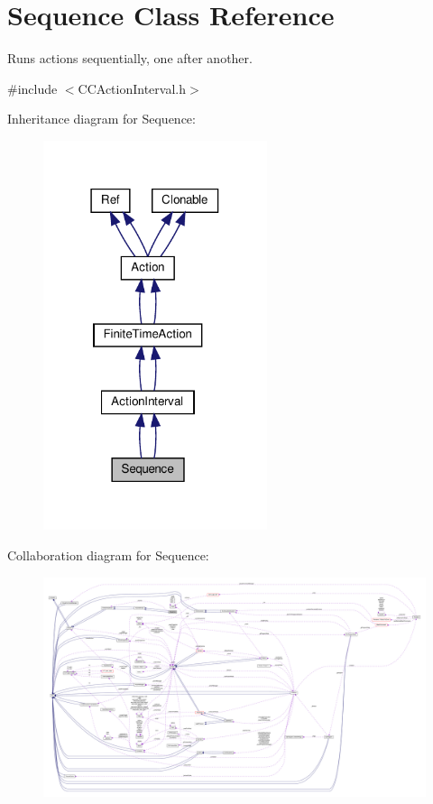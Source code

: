 \hypertarget{classSequence}{}\section{Sequence Class Reference}
\label{classSequence}


Runs actions sequentially, one after another.  




{\ttfamily \#include $<$C\+C\+Action\+Interval.\+h$>$}



Inheritance diagram for Sequence\+:
\nopagebreak
\begin{figure}[H]
\begin{center}
\leavevmode
\includegraphics[width=186pt]{classSequence__inherit__graph}
\end{center}
\end{figure}


Collaboration diagram for Sequence\+:
\nopagebreak
\begin{figure}[H]
\begin{center}
\leavevmode
\includegraphics[width=350pt]{classSequence__coll__graph}
\end{center}
\end{figure}
